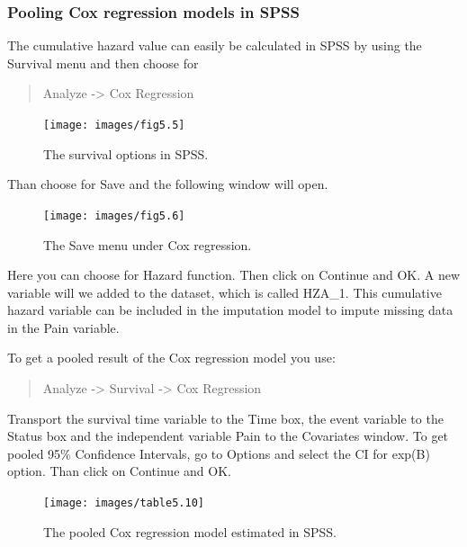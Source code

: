 \documentclass[
]{book}
\begin{document}
\hypertarget{pooling-cox-regression-models-in-spss}{%
\subsubsection{Pooling Cox regression models in SPSS}\label{pooling-cox-regression-models-in-spss}}

The cumulative hazard value can easily be calculated in SPSS by using the Survival menu and then choose for

\begin{quote}
Analyze -\textgreater{} Cox Regression
\end{quote}

\begin{figure}

{\centering \texttt{[image: images/fig5.5]} 

}

\caption{The survival options in SPSS.}\label{fig:fig5-5}
\end{figure}

Than choose for Save and the following window will open.

\begin{figure}

{\centering \texttt{[image: images/fig5.6]} 

}

\caption{The Save menu under Cox regression.}\label{fig:fig5-6}
\end{figure}

Here you can choose for Hazard function. Then click on Continue and OK. A new variable will we added to the dataset, which is called HZA\_1. This cumulative hazard variable can be included in the imputation model to impute missing data in the Pain variable.

To get a pooled result of the Cox regression model you use:

\begin{quote}
Analyze -\textgreater{} Survival -\textgreater{} Cox Regression
\end{quote}

Transport the survival time variable to the Time box, the event variable to the Status box and the independent variable Pain to the Covariates window. To get pooled 95\% Confidence Intervals, go to Options and select the CI for exp(B) option. Than click on Continue and OK.

\begin{figure}

{\centering \texttt{[image: images/table5.10]} 

}

\caption{The pooled Cox regression model estimated in SPSS.}\label{fig:tab5-10}
\end{figure}
\end{document}
